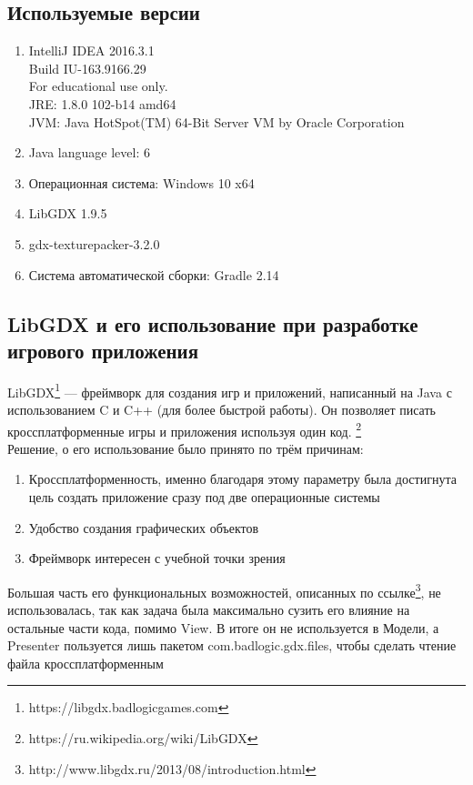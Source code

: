 \subsection{Используемые версии}

\begin{enumerate}
\item[•]  IntelliJ IDEA 2016.3.1\\
Build IU-163.9166.29\\
For educational use only.\\
JRE: 1.8.0 102-b14 amd64\\
JVM: Java HotSpot(TM) 64-Bit Server VM by Oracle Corporation\\
\item[•]  Java language level: 6
\item[•]  Операционная система: Windows 10 x64
\item[•]  LibGDX 1.9.5
\item[•]  gdx-texturepacker-3.2.0
\item[•]  Система автоматической сборки: Gradle 2.14
\end{enumerate}

\subsection{LibGDX и его использование при разработке игрового приложения}

LibGDX\footnote{https://libgdx.badlogicgames.com} — фреймворк для создания игр и приложений, написанный на Java с использованием C и C++ (для более быстрой работы). Он позволяет писать кроссплатформенные игры и приложения используя один код. \footnote{https://ru.wikipedia.org/wiki/LibGDX}\\

Решение, о его использование было принято по трём причинам:
\begin{enumerate}
\item[1]  Кроссплатформенность, именно благодаря этому параметру была достигнута цель создать приложение сразу под две операционные системы
\item[2]  Удобство создания графических объектов
\item[3]  Фреймворк интересен с учебной точки зрения
\end{enumerate}



Большая часть его функциональных возможностей, описанных по ссылке\footnote{http://www.libgdx.ru/2013/08/introduction.html}, не использовалась, так как задача была максимально сузить его влияние на остальные части кода, помимо View. В итоге он не используется в Модели, а Presenter пользуется лишь пакетом com.badlogic.gdx.files, чтобы сделать чтение файла кроссплатформенным

